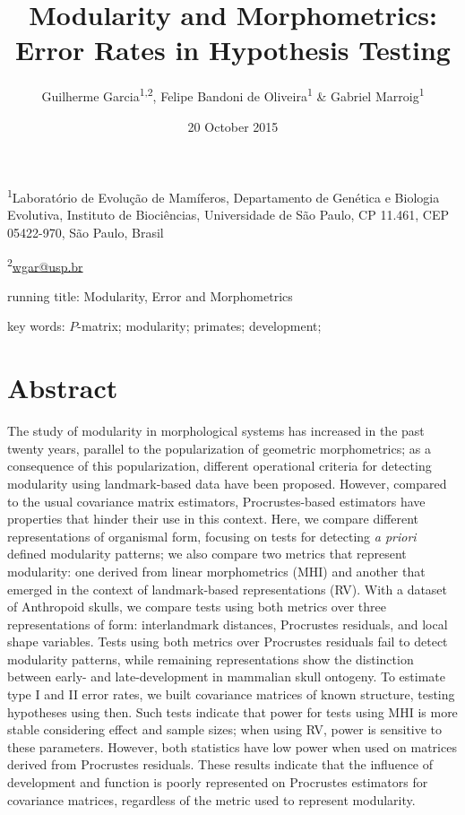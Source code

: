 \documentclass[12pt,]{article}
\title{Modularity and Morphometrics: Error Rates in Hypothesis Testing}
\author{Guilherme Garcia\textsuperscript{1,2}, Felipe Bandoni de
Oliveira\textsuperscript{1} \& Gabriel Marroig\textsuperscript{1}}
\date{20 October 2015}
\begin{document}
\maketitle


\linenumbers
\modulolinenumbers[2]

\onehalfspacing

\textsuperscript{1}Laboratório de Evolução de Mamíferos, Departamento de
Genética e Biologia Evolutiva, Instituto de Biociências, Universidade de
São Paulo, CP 11.461, CEP 05422-970, São Paulo, Brasil

\textsuperscript{2}\href{mailto:wgar@usp.br}{wgar@usp.br}

running title: Modularity, Error and Morphometrics

key words: $P$-matrix; modularity; primates; development;

\section{Abstract}\label{abstract}

The study of modularity in morphological systems has increased in the
past twenty years, parallel to the popularization of geometric
morphometrics; as a consequence of this popularization, different
operational criteria for detecting modularity using landmark-based data
have been proposed. However, compared to the usual covariance matrix
estimators, Procrustes-based estimators have properties that hinder
their use in this context. Here, we compare different representations of
organismal form, focusing on tests for detecting \emph{a priori} defined
modularity patterns; we also compare two metrics that represent
modularity: one derived from linear morphometrics (MHI) and another that
emerged in the context of landmark-based representations (RV). With a
dataset of Anthropoid skulls, we compare tests using both metrics over
three representations of form: interlandmark distances, Procrustes
residuals, and local shape variables. Tests using both metrics over
Procrustes residuals fail to detect modularity patterns, while remaining
representations show the distinction between early- and late-development
in mammalian skull ontogeny. To estimate type I and II error rates, we
built covariance matrices of known structure, testing hypotheses using
then. Such tests indicate that power for tests using MHI is more stable
considering effect and sample sizes; when using RV, power is sensitive
to these parameters. However, both statistics have low power when used
on matrices derived from Procrustes residuals. These results indicate
that the influence of development and function is poorly represented on
Procrustes estimators for covariance matrices, regardless of the metric
used to represent modularity.
\end{document}
